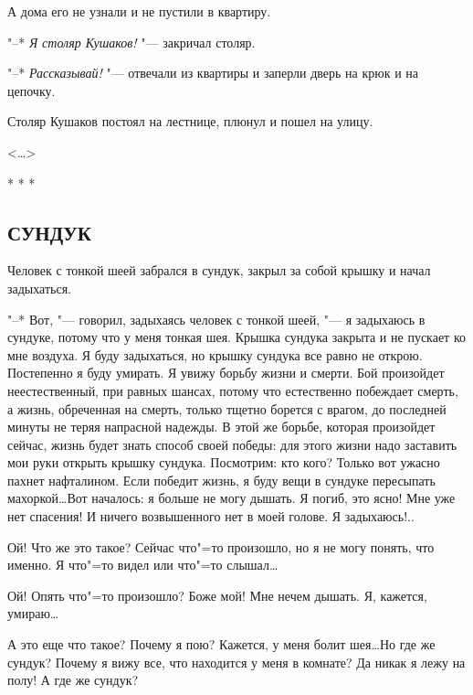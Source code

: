 \documentclass{article}
\begin{document}
    А дома его не узнали и не пустили в квартиру.

    "--* \textit{Я столяр Кушаков!} "--- закричал столяр.

    "--* \textit{Рассказывай!} "---  отвечали из квартиры и
заперли дверь на крюк и на цепочку.

    Столяр Кушаков постоял на лестнице, 
    плюнул и пошел на улицу.
\begin{flushright}
<\dots>
\end{flushright}

\begin{center}
* * *
\end{center}

\begin{center}
\section*{СУНДУК}
\end{center}

Человек с тонкой шеей забрался в сундук,
закрыл за собой крышку и начал задыхаться.

"--* Вот,  "---  говорил,  задыхаясь человек с
тонкой шеей, "--- я задыхаюсь в сундуке, потому
что у меня тонкая шея. Крышка сундука закрыта 
и не пускает ко мне воздуха. Я буду задыхаться, 
но крышку сундука все  равно  не открою. 
Постепенно я буду умирать. Я увижу борьбу 
жизни и смерти.  Бой произойдет неестественный,  
при равных шансах, потому что естественно  
побеждает смерть, а жизнь,  обреченная на смерть,  
только тщетно  борется  с
врагом, до последней минуты не теряя напрасной 
надежды. В этой же  борьбе, которая произойдет  
сейчас,  жизнь  будет  знать способ
своей победы: для этого жизни надо заставить
мои руки открыть крышку сундука.  Посмотрим:
кто кого? Только вот ужасно пахнет  нафталином. 
Если победит жизнь, я буду вещи в  сундуке 
пересыпать  махоркой\dots  Вот  началось:
я больше  не могу дышать. Я погиб, это ясно!
Мне уже нет спасения! И ничего  возвышенного
нет в моей голове. Я задыхаюсь!..

    Ой! Что же это такое? Сейчас что"=то произошло, 
    но я не могу понять, что  именно.  Я
что"=то видел или что"=то слышал\dots

    Ой! Опять  что"=то  произошло?  Боже мой!
Мне нечем дышать. Я, кажется, умираю\dots

    А это еще что такое?  Почему я пою?  Кажется, 
    у меня болит шея\dots Но где же сундук?
Почему  я  вижу все,  что находится у меня в
комнате? Да никак  я лежу на полу!  А где же
сундук?
\end{document}
